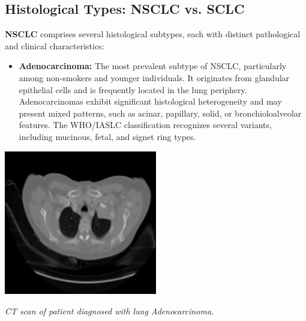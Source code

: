 
\subsection{Histological Types: NSCLC vs. SCLC}

\textbf{NSCLC} comprises several histological subtypes, each with distinct pathological and clinical 
characteristics:

\begin{itemize}
    \item \textbf{Adenocarcinoma:} The most prevalent subtype of NSCLC, particularly among 
    non-smokers and younger individuals. It originates from glandular epithelial cells and is 
    frequently located in the lung periphery. Adenocarcinomas exhibit significant histological 
    heterogeneity and may present mixed patterns, such as acinar, papillary, solid, or 
    bronchioloalveolar features. The WHO/IASLC classification recognizes several variants, including 
    mucinous, fetal, and signet ring types. \cite{nlm2025}
\end{itemize}

\vspace{1em}
\begin{center}
    \includegraphics[width=0.5\textwidth]{../assets/01-overview/lc-adc-ct.jpeg}

    \small\textit{CT scan of patient diagnosed with lung Adenocarcinoma. \cite{SHATNAWI2025100188}}
\end{center}
\vspace{1em}

